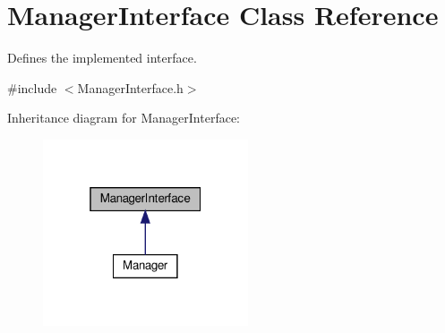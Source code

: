 \hypertarget{classManagerInterface}{}\section{Manager\+Interface Class Reference}
\label{classManagerInterface}


Defines the implemented interface.  




{\ttfamily \#include $<$Manager\+Interface.\+h$>$}



Inheritance diagram for Manager\+Interface\+:\nopagebreak
\begin{figure}[H]
\begin{center}
\leavevmode
\includegraphics[width=172pt]{classManagerInterface__inherit__graph}
\end{center}
\end{figure}
